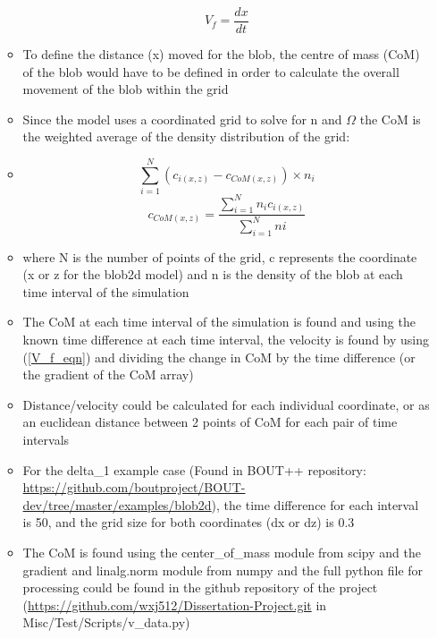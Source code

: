 \documentclass{article}
\begin{document}
\begin{arrowlist}
\begin{itemize}
\begin{itemize}
                \begin{equation}\label{V_f_eqn}
                    V_f=\frac{dx}{dt}
                \end{equation}
                \item To define the distance (x) moved for the blob, the centre of mass (CoM) of the blob would have to be defined in order to calculate the overall movement of the blob within the grid
                \item Since the model uses a coordinated grid to solve for n and $\Omega$ the CoM is the weighted average of the density distribution of the grid:
                \item[] \[ \sum_{i=1}^{N} \left(c_{i(x,z)}-c_{CoM(x,z)}\right)\times n_i \]
                \begin{equation}
                    c_{CoM(x,z)}=\frac{\sum_{i=1}^{N} n_ic_{i(x,z)}}{\sum_{i=1}^{N} ni}
                \end{equation} 
                \item where N is the number of points of the grid, c represents the coordinate (x or z for the blob2d model) and n is the density of the blob at each time interval of the simulation
                \item The CoM at each time interval of the simulation is found and using the known time difference at each time interval, the velocity is found by using (\ref{V_f_eqn}) and dividing the change in CoM by the time difference (or the gradient of the CoM array)
                \item Distance/velocity could be calculated for each individual coordinate, or as an euclidean distance between 2 points of CoM for each pair of time intervals
                \item For the delta\_1 example case (Found in BOUT++ repository: \url {https://github.com/boutproject/BOUT-dev/tree/master/examples/blob2d}), the time difference for each interval is 50, and the grid size for both coordinates (dx or dz) is 0.3
                \item The CoM is found using the center\_of\_mass module from scipy and the gradient and linalg.norm module from numpy and the full python file for processing could be found in the github repository of the project (\url{https://github.com/wxj512/Dissertation-Project.git} in Misc/Test/Scripts/v\_data.py)
            \end{itemize}  
       \end{itemize}


\end{arrowlist}
\end{document}
